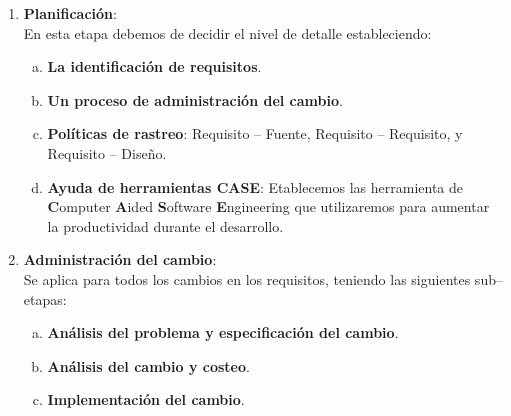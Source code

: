\begin{enumerate}
    \item \textbf{Planificación}:\\
    En esta etapa debemos de decidir el nivel de detalle estableciendo:
    \begin{enumerate}[a.]
        \item \textbf{La identificación de requisitos}.
        \item \textbf{Un proceso de administración del cambio}.
        \item \textbf{Políticas de rastreo}: Requisito -- Fuente, Requisito -- Requisito, y Requisito -- Diseño.
        \item \textbf{Ayuda de herramientas CASE}: Etablecemos las herramienta de \textbf{C}omputer \textbf{A}ided \textbf{S}oftware \textbf{E}ngineering que utilizaremos para aumentar la productividad durante el desarrollo.
    \end{enumerate}
    
    \item \textbf{Administración del cambio}:\\
    Se aplica para todos los cambios en los requisitos, teniendo las siguientes sub--etapas:
        \begin{enumerate}[a.]
        \item \textbf{Análisis del problema y especificación del cambio}.
        \item \textbf{Análisis del cambio y costeo}.
        \item \textbf{Implementación del cambio}.
\end{enumerate}
    
\end{enumerate}

